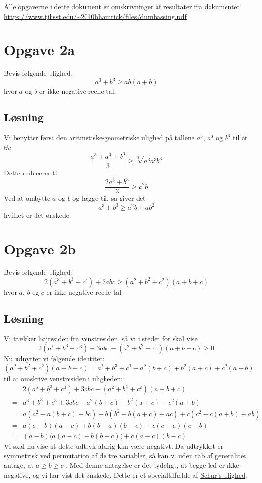 \documentclass[12pt,oneside,a4paper]{article}
\newcommand{\bas}{\begin{eqnarray*}}
\newcommand{\eas}{\end{eqnarray*}}
\begin{document}
Alle opgaverne i dette dokument er omskrivninger af resultater fra dokumentet 
\url{https://www.tjhsst.edu/~2010bhamrick/files/dumbassing.pdf}


\section{Opgave 2a}
Bevis følgende ulighed:
$$
a^3+b^3 \ge ab(a+b)
$$
hvor $a$ og $b$ er ikke-negative reelle tal.

\subsection{Løsning}

Vi benytter først den aritmetiske-geometriske ulighed på tallene $a^3$, $a^3$ og $b^3$ til at få:
$$
\frac{a^3+a^3+b^3}{3} \ge \sqrt[3]{a^3 a^3 b^3}
$$
Dette reducerer til
$$
\frac{2a^3+b^3}{3} \ge a^2b
$$
Ved at ombytte $a$ og $b$ og lægge til, så giver det
$$
a^3+b^3 \ge a^2b + ab^2
$$
hvilket er det ønskede.

\section{Opgave 2b}
Bevis følgende ulighed:
$$
2(a^3+b^3+c^3) + 3abc \ge (a^2+b^2+c^2)(a+b+c)
$$
hvor $a$, $b$ og $c$ er ikke-negative reelle tal.

\subsection{Løsning}

Vi trækker højresiden fra venstresiden, så vi i stedet for skal vise
$$
2(a^3+b^3+c^3) + 3abc - (a^2+b^2+c^2)(a+b+c) \ge 0
$$
Nu udnytter vi følgende identitet:
$$
(a^2+b^2+c^2)(a+b+c) = a^3+b^3+c^3 + a^2(b+c) + b^2(a+c) + c^2(a+b)
$$
til at omskrive venstresiden i uligheden:
\bas
&& 2(a^3+b^3+c^3) + 3abc - (a^2+b^2+c^2)(a+b+c) \\
&=& a^3+b^3+c^3 + 3abc - a^2(b+c) - b^2(a+c) - c^2(a+b) \\
&=& a\left(a^2-a(b+c)+bc\right) + b\left(b^2-b(a+c)+ac\right) + c\left(c^2-c(a+b)+ab\right) \\
&=& a(a-b)(a-c) + b(b-a)(b-c) + c(c-a)(c-b) \\
&=& (a-b)\Big(a(a-c)-b(b-c)\Big) + c(a-c)(b-c)
\eas
Vi skal nu vise at dette udtryk aldrig kan være negativt.  Da udtrykket er
symmetrisk ved permutation af de tre variabler, så kan vi uden tab af
generalitet antage, at $a \ge b \ge c$ .  Med denne antagelse er det tydeligt,
at begge led er ikke-negative, og vi har vist det ønskede.
Dette er et specialtilfælde af \href{https://en.wikipedia.org/wiki/Schur\%27s\_inequality}{Schur's ulighed}.
\end{document}
